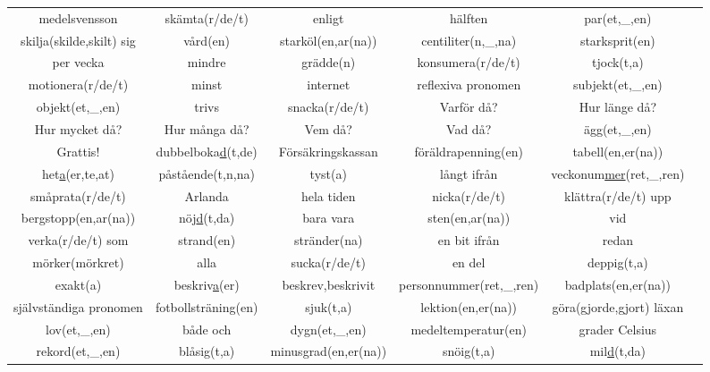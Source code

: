 
\begin{center}
    \begin{adjustwidth}{-2.5cm}{}
        \begin{tabular}{|c c c c c c|}
            \hline
            medelsvensson & skämta(r/de/t) & enligt & hälften & par(et,\_,en) &  \\
            skilja(skilde,skilt) sig & vård(en) & starköl(en,ar(na)) & centiliter(n,\_,na) & starksprit(en) &  \\
            per vecka & mindre & grädde(n) & konsumera(r/de/t) & tjock(t,a) &  \\
            motionera(r/de/t) & minst & internet & reflexiva pronomen & subjekt(et,\_,en) &  \\
            objekt(et,\_,en) & trivs & snacka(r/de/t) & Varför då? & Hur länge då? &  \\
            Hur mycket då? & Hur många då? & Vem då? & Vad då? & ägg(et,\_,en) &  \\
            Grattis! & dubbelboka\underline{d}(t,de) & Försäkringskassan & föräldrapenning(en) & tabell(en,er(na)) &  \\
            het\underline{a}(er,te,at) & påstående(t,n,na) & tyst(a) & långt ifrån & veckonum\underline{mer}(ret,\_,ren) &  \\
            småprata(r/de/t) & Arlanda & hela tiden & nicka(r/de/t) & klättra(r/de/t) upp &  \\
            bergstopp(en,ar(na)) & nöj\underline{d}(t,da) & bara vara & sten(en,ar(na)) & vid &  \\
            verka(r/de/t) som & strand(en) & stränder(na) & en bit ifrån & redan &  \\
            mörker(mörkret) & alla & sucka(r/de/t) & en del & deppig(t,a) &  \\
            exakt(a) & beskriv\underline{a}(er) & beskrev,beskrivit & personnummer(ret,\_,ren) & badplats(en,er(na)) &  \\
            självständiga pronomen & fotbollsträning(en) & sjuk(t,a) & lektion(en,er(na)) & göra(gjorde,gjort) läxan &  \\
            lov(et,\_,en) & både och & dygn(et,\_,en) & medeltemperatur(en) & grader Celsius &  \\
            rekord(et,\_,en) & blåsig(t,a) & minusgrad(en,er(na)) & snöig(t,a) & mil\underline{d}(t,da) &  \\

\end{tabular}
\end{adjustwidth}
\end{center}
